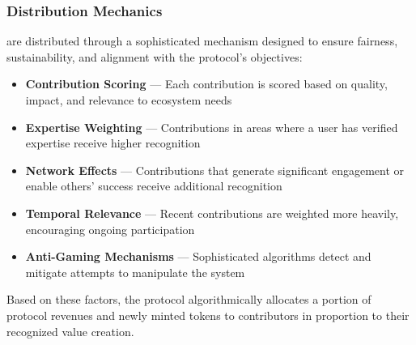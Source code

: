 \subsubsection*{Distribution Mechanics}

 are distributed through a sophisticated mechanism designed to ensure fairness, sustainability, and alignment with the protocol's objectives:

\begin{itemize}
    \item \textbf{Contribution Scoring} — Each contribution is scored based on quality, impact, and relevance to ecosystem needs
    
    \item \textbf{Expertise Weighting} — Contributions in areas where a user has verified expertise receive higher recognition
    
    \item \textbf{Network Effects} — Contributions that generate significant engagement or enable others' success receive additional recognition
    
    \item \textbf{Temporal Relevance} — Recent contributions are weighted more heavily, encouraging ongoing participation
    
    \item \textbf{Anti-Gaming Mechanisms} — Sophisticated algorithms detect and mitigate attempts to manipulate the system
\end{itemize}

Based on these factors, the protocol algorithmically allocates a portion of protocol revenues and newly minted tokens to contributors in proportion to their recognized value creation.

